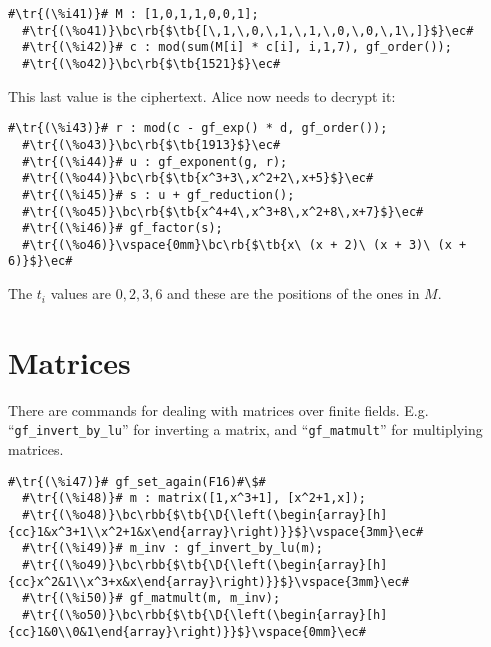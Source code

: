 \documentclass[a4paper,11pt,leqno,fleqn]{artikel3}
\newcommand{\D}{\displaystyle}
\newcommand{\bc}{\begin{center}}
\newcommand{\ec}{\end{center}}
\newcommand{\tr}[1]{\textcolor{red}{#1}}
\newcommand{\tb}[1]{\textcolor{blue}{#1}}
\newcommand{\rb}[1]{\raisebox{2mm}[0mm][1mm]{#1}}
\newcommand{\rbb}[1]{\raisebox{-4mm}[0mm][9mm]{#1}}
\begin{document}
\vspace*{2mm}
\begin{lstlisting}[escapechar=\#]
  #\tr{(\%i41)}# M : [1,0,1,1,0,0,1];
  #\tr{(\%o41)}\bc\rb{$\tb{[\,1,\,0,\,1,\,1,\,0,\,0,\,1\,]}$}\ec#
  #\tr{(\%i42)}# c : mod(sum(M[i] * c[i], i,1,7), gf_order());
  #\tr{(\%o42)}\bc\rb{$\tb{1521}$}\ec#
\end{lstlisting}

This last value is the ciphertext.  Alice now needs to decrypt it:

\vspace*{-4mm}
\begin{lstlisting}[escapechar=\#]
  #\tr{(\%i43)}# r : mod(c - gf_exp() * d, gf_order());
  #\tr{(\%o43)}\bc\rb{$\tb{1913}$}\ec#
  #\tr{(\%i44)}# u : gf_exponent(g, r);
  #\tr{(\%o44)}\bc\rb{$\tb{x^3+3\,x^2+2\,x+5}$}\ec#
  #\tr{(\%i45)}# s : u + gf_reduction();
  #\tr{(\%o45)}\bc\rb{$\tb{x^4+4\,x^3+8\,x^2+8\,x+7}$}\ec#
  #\tr{(\%i46)}# gf_factor(s);
  #\tr{(\%o46)}\vspace{0mm}\bc\rb{$\tb{x\ (x + 2)\ (x + 3)\ (x + 6)}$}\ec#
\end{lstlisting}

The $t_i$ values are $0,2,3,6$ and these are the positions of the ones in $M$.

\vspace*{-3mm}
\section*{Matrices}

There are commands for dealing with matrices over finite fields. E.g.
``\verb!gf_invert_by_lu!'' for inverting a matrix, and ``\verb!gf_matmult!'' for
multiplying matrices.

\vspace*{2mm}
\begin{lstlisting}[escapechar=\#]
  #\tr{(\%i47)}# gf_set_again(F16)#\$#
  #\tr{(\%i48)}# m : matrix([1,x^3+1], [x^2+1,x]);
  #\tr{(\%o48)}\bc\rbb{$\tb{\D{\left(\begin{array}[h]{cc}1&x^3+1\\x^2+1&x\end{array}\right)}}$}\vspace{3mm}\ec#
  #\tr{(\%i49)}# m_inv : gf_invert_by_lu(m);
  #\tr{(\%o49)}\bc\rbb{$\tb{\D{\left(\begin{array}[h]{cc}x^2&1\\x^3+x&x\end{array}\right)}}$}\vspace{3mm}\ec#
  #\tr{(\%i50)}# gf_matmult(m, m_inv);
  #\tr{(\%o50)}\bc\rbb{$\tb{\D{\left(\begin{array}[h]{cc}1&0\\0&1\end{array}\right)}}$}\vspace{0mm}\ec#
\end{lstlisting}
\end{document}
